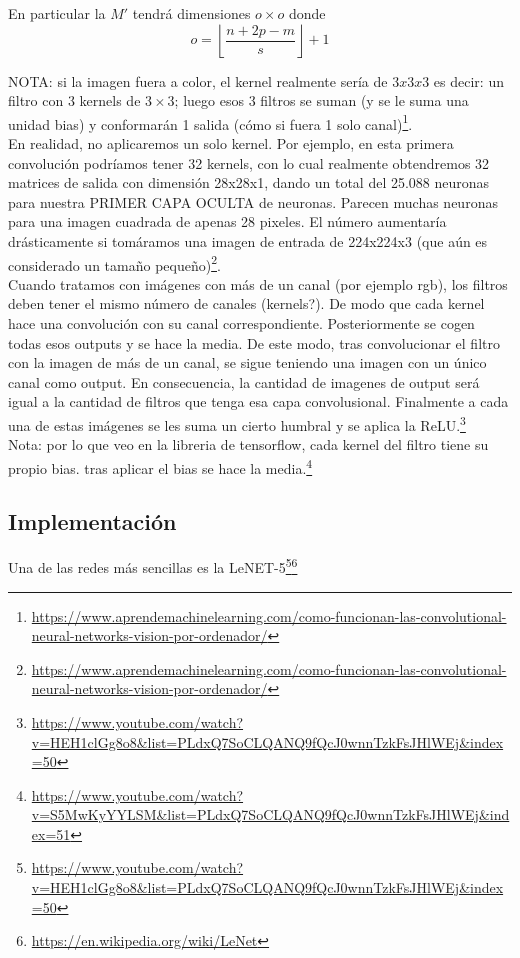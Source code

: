 \documentclass{article}
\begin{document}
En particular la $M'$ tendrá dimensiones $o\times o$ donde
$$o=\left\lfloor \frac{n+2p-m}{s}\right\rfloor+1$$

NOTA: si la imagen fuera a color, el kernel realmente sería de $3x3x3$ es decir: un filtro con 3 kernels de $3\times3$; luego  esos 3 filtros se suman (y se le suma una unidad bias) y conformarán 1 salida (cómo si fuera 1 solo canal)\footnote{\url{https://www.aprendemachinelearning.com/como-funcionan-las-convolutional-neural-networks-vision-por-ordenador/}}.\\

En realidad, no aplicaremos un solo kernel. Por ejemplo, en esta primera convolución podríamos tener 32 kernels, con lo cual realmente obtendremos 32 matrices de salida con dimensión 28x28x1, dando un total del 25.088 neuronas para nuestra PRIMER CAPA OCULTA de neuronas. Parecen muchas neuronas para una imagen cuadrada de apenas 28 pixeles. El número aumentaría drásticamente si tomáramos una imagen de entrada de 224x224x3 (que aún es considerado un tamaño pequeño)\footnote{\url{https://www.aprendemachinelearning.com/como-funcionan-las-convolutional-neural-networks-vision-por-ordenador/}}.\\

Cuando tratamos con imágenes con más de un canal (por ejemplo rgb), los filtros deben tener el  mismo número de canales (kernels?). De modo que cada kernel  hace una convolución con su canal correspondiente. Posteriormente se cogen todas esos outputs y se hace la media. De este modo, tras convolucionar el filtro con la imagen de más de un canal, se sigue teniendo una imagen con un único canal como output. En consecuencia, la cantidad de imagenes de output será igual a la cantidad de filtros que tenga esa capa convolusional. Finalmente a cada una de estas imágenes se les suma un cierto humbral y se aplica la ReLU.\footnote{\url{https://www.youtube.com/watch?v=HEH1clGg8o8&list=PLdxQ7SoCLQANQ9fQcJ0wnnTzkFsJHlWEj&index=50}}\\

Nota: por lo que veo en la libreria de tensorflow, cada kernel del filtro tiene su propio bias. tras aplicar el bias se hace la media.\footnote{\url{https://www.youtube.com/watch?v=S5MwKyYYLSM&list=PLdxQ7SoCLQANQ9fQcJ0wnnTzkFsJHlWEj&index=51}}

\subsection{Implementación}
Una de las redes más sencillas es la LeNET-5\footnote{\url{https://www.youtube.com/watch?v=HEH1clGg8o8&list=PLdxQ7SoCLQANQ9fQcJ0wnnTzkFsJHlWEj&index=50}}\footnote{\url{https://en.wikipedia.org/wiki/LeNet}}
\end{document}
